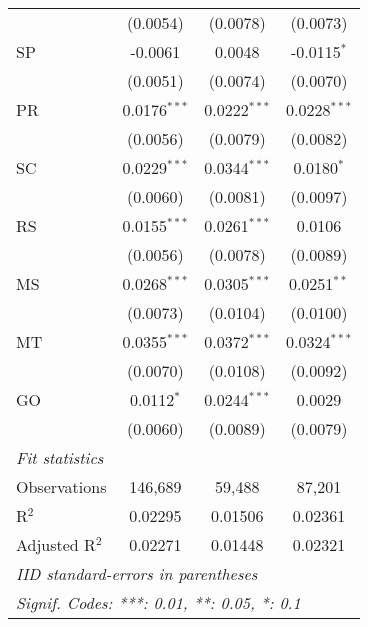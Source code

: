 \begin{tabular}{lccc}
                   & (0.0054)                & (0.0078)                & (0.0073)\\   
   SP              & -0.0061                 & 0.0048                  & -0.0115$^{*}$\\   
                   & (0.0051)                & (0.0074)                & (0.0070)\\   
   PR              & 0.0176$^{***}$          & 0.0222$^{***}$          & 0.0228$^{***}$\\   
                   & (0.0056)                & (0.0079)                & (0.0082)\\   
   SC              & 0.0229$^{***}$          & 0.0344$^{***}$          & 0.0180$^{*}$\\   
                   & (0.0060)                & (0.0081)                & (0.0097)\\   
   RS              & 0.0155$^{***}$          & 0.0261$^{***}$          & 0.0106\\   
                   & (0.0056)                & (0.0078)                & (0.0089)\\   
   MS              & 0.0268$^{***}$          & 0.0305$^{***}$          & 0.0251$^{**}$\\   
                   & (0.0073)                & (0.0104)                & (0.0100)\\   
   MT              & 0.0355$^{***}$          & 0.0372$^{***}$          & 0.0324$^{***}$\\   
                   & (0.0070)                & (0.0108)                & (0.0092)\\   
   GO              & 0.0112$^{*}$            & 0.0244$^{***}$          & 0.0029\\   
                   & (0.0060)                & (0.0089)                & (0.0079)\\   
   \midrule
   \emph{Fit statistics}\\
   Observations    & 146,689                 & 59,488                  & 87,201\\  
   R$^2$           & 0.02295                 & 0.01506                 & 0.02361\\  
   Adjusted R$^2$  & 0.02271                 & 0.01448                 & 0.02321\\  
   \midrule \midrule
   \multicolumn{4}{l}{\emph{IID standard-errors in parentheses}}\\
   \multicolumn{4}{l}{\emph{Signif. Codes: ***: 0.01, **: 0.05, *: 0.1}}\\
\end{tabular}
\par\endgroup


